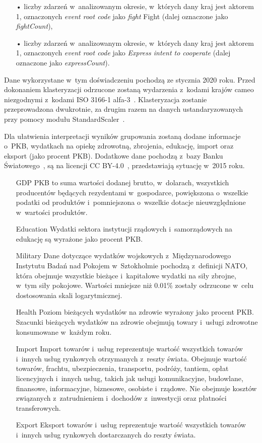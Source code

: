 \documentclass[11pt]{report}
\begin{document}
\begin{enumerate}
        \item[•] liczby zdarzeń w~analizowanym okresie, w~których dany kraj jest aktorem 1, oznaczonych \textit{event root code} jako \textit{fight} Fight (dalej oznaczone jako \textit{fightCount}),
        \item[•] liczby zdarzeń w~analizowanym okresie, w~których dany kraj jest aktorem 1, oznaczonych \textit{event root code} jako \textit{Express intent to cooperate}  (dalej oznaczone jako \textit{expressCount}).
    \end{enumerate}
    Dane wykorzystane w~tym doświadczeniu pochodzą ze stycznia 2020 roku.
    Przed dokonaniem klasteryzacji odrzucone zostaną wydarzenia z~kodami krajów cameo niezgodnymi z~kodami ISO 3166-1 alfa-3~\cite{iso_alfa3}.
    Klasteryzacja zostanie przeprowadzona dwukrotnie, za drugim razem na danych ustandaryzowanych przy pomocy modułu StandardScaler~\cite{standardScaler}.

    Dla ułatwienia interpretacji wyników grupowania zostaną dodane informacje o~PKB, wydatkach na opiekę zdrowotną, zbrojenia, edukację, import oraz eksport (jako procent PKB).
    Dodatkowe dane pochodzą z~bazy Banku Światowego~\cite{worldbank}, są na licencji CC BY-4.0~\cite{wblicense}, przedstawiają sytuację w~2015 roku.
    \begin{enumerate}
        \item[GDP] PKB to suma wartości dodanej brutto, w~dolarach, wszystkich producentów będących rezydentami w~gospodarce, powiększona o~wszelkie podatki od produktów i~pomniejszona o~wszelkie dotacje nieuwzględnione w~wartości produktów.
        \item[Education] Wydatki sektora instytucji rządowych i~samorządowych na edukację są wyrażone jako procent PKB.
        \item[Military] Dane dotyczące wydatków wojskowych z~Międzynarodowego Instytutu Badań nad Pokojem w~Sztokholmie pochodzą z~definicji NATO, która obejmuje wszystkie bieżące i~kapitałowe wydatki na siły zbrojne, w~tym siły pokojowe.
        Wartości mniejsze niż 0.01\% zostały odrzucone w~celu dostosowania skali logarytmicznej.
        \item[Health] Poziom bieżących wydatków na zdrowie wyrażony jako procent PKB. Szacunki bieżących wydatków na zdrowie obejmują towary i~usługi zdrowotne konsumowane w~każdym roku.
        \item[Import] Import towarów i~usług reprezentuje wartość wszystkich towarów i~innych usług rynkowych otrzymanych z~reszty świata.
        Obejmuje wartość towarów, frachtu, ubezpieczenia, transportu, podróży, tantiem, opłat licencyjnych i~innych usług, takich jak usługi komunikacyjne, budowlane, finansowe, informacyjne, biznesowe, osobiste i~rządowe.
        Nie obejmuje kosztów związanych z~zatrudnieniem i~dochodów z~inwestycji oraz płatności transferowych.
        \item[Export] Eksport towarów i~usług reprezentuje wartość wszystkich towarów i~innych usług rynkowych dostarczanych do reszty świata.
    \end{enumerate}
\end{document}

